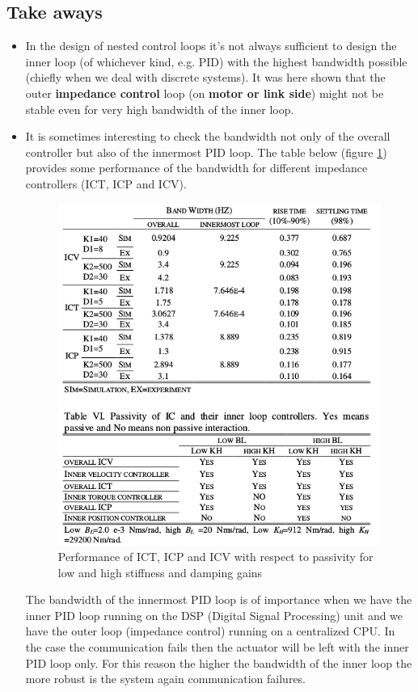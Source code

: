 \subsection*{Take aways}
\begin{itemize}
\item In the design of nested control loops it's not always sufficient to design the inner loop (of whichever kind, e.g. PID) with the highest bandwidth possible (chiefly when we deal with discrete systems). It was here shown that the outer \textbf{impedance control} loop (on \textbf{motor or link side}) might not be stable even for very high bandwidth of the inner loop. 
\item It is sometimes interesting to check the bandwidth not only of the overall controller but also of the innermost PID loop. The table below (figure \ref{ICperformance}) provides some performance of the bandwidth for different impedance controllers (ICT, ICP and ICV).\begin{figure}[h!]
  \centering
  \includegraphics[width=120mm]{PassivityOfICcontrollers}
  \caption{Performance of ICT, ICP and ICV with respect to passivity for low and high stiffness and damping gains}
  \label{ICperformance}
\end{figure}
The bandwidth of the innermost PID loop is of importance when we have the inner PID loop running on the DSP (Digital Signal Processing) unit and we have the outer loop (impedance control) running on a centralized CPU. In the case the communication fails then the actuator will be left with the inner PID loop only. For this reason the higher the bandwidth of the inner loop the more robust is the system again communication failures.
\end{itemize}
